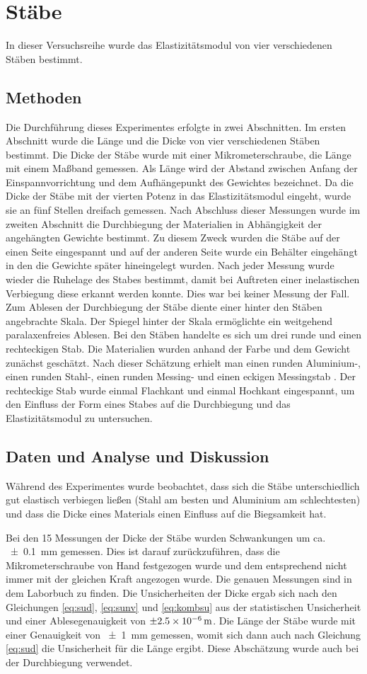\section{Stäbe}
In dieser Versuchsreihe wurde das Elastizitätsmodul von vier verschiedenen Stäben bestimmt.
\subsection{Methoden}
Die Durchführung dieses Experimentes erfolgte in zwei Abschnitten.
Im ersten Abschnitt wurde die Länge und die Dicke von vier verschiedenen Stäben bestimmt.
Die Dicke der Stäbe wurde mit einer Mikrometerschraube, die Länge  mit einem Maßband gemessen. Als Länge wird der Abstand zwischen Anfang der Einspannvorrichtung   und dem Aufhängepunkt des Gewichtes bezeichnet.
Da die Dicke der Stäbe mit der vierten Potenz in das Elastizitätsmodul eingeht, wurde sie an fünf Stellen dreifach gemessen.  Nach Abschluss dieser Messungen wurde im zweiten Abschnitt die Durchbiegung der Materialien in Abhängigkeit der angehängten Gewichte bestimmt. Zu diesem Zweck wurden die Stäbe auf der einen Seite eingespannt und auf der anderen Seite wurde ein Behälter eingehängt in den die Gewichte später hineingelegt wurden.
Nach jeder Messung wurde wieder die Ruhelage des Stabes bestimmt, damit bei Auftreten einer inelastischen Verbiegung diese erkannt werden konnte. Dies war bei keiner Messung der Fall. Zum Ablesen der Durchbiegung der Stäbe diente einer hinter den Stäben angebrachte Skala. Der Spiegel hinter der Skala ermöglichte ein weitgehend paralaxenfreies Ablesen.
Bei den Stäben handelte es sich um drei runde und einen rechteckigen Stab. Die Materialien wurden anhand der Farbe und dem Gewicht zunächst geschätzt.
Nach dieser Schätzung erhielt man einen runden Aluminium-, einen runden Stahl-, einen runden Messing- und einen eckigen Messingstab . Der rechteckige Stab wurde einmal Flachkant und einmal Hochkant eingespannt, um den Einfluss der Form eines Stabes auf die Durchbiegung und das Elastizitätsmodul zu untersuchen.

\subsection{Daten und Analyse und Diskussion}
Während des Experimentes wurde beobachtet, dass sich die Stäbe unterschiedlich gut elastisch verbiegen ließen (Stahl am besten und Aluminium am schlechtesten) und dass die Dicke eines Materials einen Einfluss auf die Biegsamkeit hat.

Bei  den 15 Messungen der Dicke der Stäbe wurden Schwankungen um ca. \SI{+-0,1}{mm} gemessen. Dies ist darauf zurückzuführen, dass die Mikrometerschraube von Hand festgezogen wurde und dem entsprechend nicht immer mit der gleichen Kraft angezogen wurde.
Die genauen Messungen sind in dem Laborbuch zu finden. Die Unsicherheiten der Dicke ergab sich nach den Gleichungen \ref{eq:sud}, \ref{eq:sunv} und \ref{eq:kombsu} aus der statistischen Unsicherheit und einer Ablesegenauigkeit von $\SI{\pm 2.5e-6}{m}$.   
Die Länge der Stäbe wurde mit einer Genauigkeit von \SI{+-1}{mm} gemessen, womit sich dann auch nach Gleichung \ref{eq:sud} die Unsicherheit für die Länge ergibt. Diese Abschätzung wurde auch bei der Durchbiegung verwendet.

